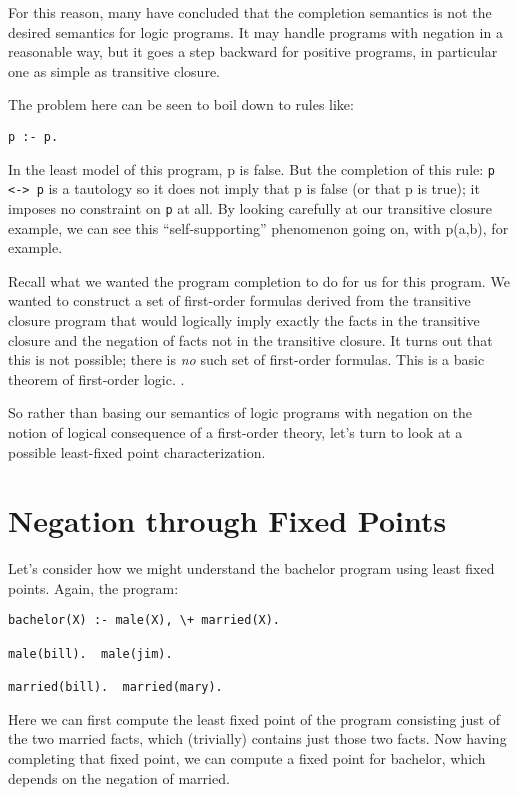 For this reason, many have concluded that the completion semantics is
not the desired semantics for logic programs.  It may handle programs
with negation in a reasonable way, but it goes a step backward for
positive programs, in particular one as simple as transitive closure.

The problem here can be seen to boil down to rules like:
\begin{verbatim}
p :- p.
\end{verbatim}
In the least model of this program, p is false.  But the completion of
this rule: \verb|p <-> p| is a tautology so it does not imply that p
is false (or that p is true); it imposes no constraint on \verb|p| at
all.  By looking carefully at our transitive closure example, we can
see this ``self-supporting'' phenomenon going on, with p(a,b), for
example.

Recall what we wanted the program completion to do for us for this
program.  We wanted to construct a set of first-order formulas derived
from the transitive closure program that would logically imply exactly
the facts in the transitive closure and the negation of facts not in
the transitive closure.  It turns out that this is not possible; there
is {\em no} such set of first-order formulas.  This is a basic theorem
of first-order logic. \cite{}.

So rather than basing our semantics of logic programs with negation on
the notion of logical consequence of a first-order theory, let's turn
to look at a possible least-fixed point characterization.

\section{Negation through Fixed Points}

Let's consider how we might understand the bachelor program using
least fixed points.  Again, the program:
\begin{verbatim}
bachelor(X) :- male(X), \+ married(X).

male(bill).  male(jim).

married(bill).  married(mary).
\end{verbatim}
Here we can first compute the least fixed point of the program
consisting just of the two married facts, which (trivially) contains
just those two facts.  Now having completing that fixed point, we can
compute a fixed point for bachelor, which depends on the negation of
married.  




